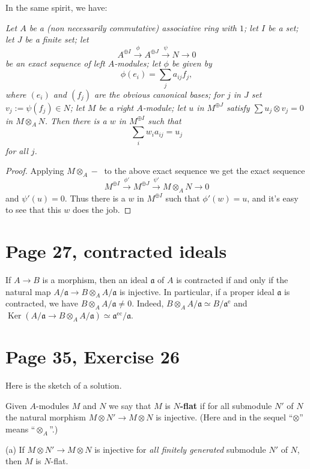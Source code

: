 \documentclass[12pt]{article}
\newcommand{\oo}{\operatorname}
\newcommand{\mf}{\mathfrak}
\begin{document}
In the same spirit, we have:

\emph{Let $A$ be a (non necessarily commutative) associative ring with $1$; let $I$ be a set; let $J$ be a finite set; let 
$$
A^{\oplus I}\xrightarrow\phi A^{\oplus J}\xrightarrow\psi N\to0
$$ 
be an exact sequence of left $A$-modules; let $\phi$ be given by 
$$
\phi(e_i)=\sum_ja_{ij}f_j,
$$ 
where $(e_i)$ and $(f_j)$ are the obvious canonical bases; for $j$ in $J$ set $v_j:=\psi(f_j)\in N$; let $M$ be a right $A$-module; let $u$ in $M^{\oplus J}$ satisfy $\sum u_j\otimes v_j=0$ in $M\otimes_AN$. Then there is a $w$ in $M^{\oplus I}$ such that 
$$
\sum_iw_ia_{ij}=u_j
$$ 
for all $j$.}

\begin{proof} 
Applying $M\otimes_A-\ $ to the above exact sequence we get the exact sequence 
$$
M^{\oplus I}\xrightarrow{\phi'}M^{\oplus J}\xrightarrow{\psi'}M\otimes_AN\to0
$$ 
and $\psi'(u)=0$. Thus there is a $w$ in $M^{\oplus I}$ such that $\phi'(w)=u$, and it's easy to see that this $w$ does the job. 
\end{proof}

\section{Page 27, contracted ideals}\label{27}%

If $A\to B$ is a morphism, then an ideal $\mf a$ of $A$ is contracted if and only if the natural map $A/\mf a\to B\otimes_A A/\mf a$ is injective. In particular, if a proper ideal $\mf a$ is contracted, we have $B\otimes_A A/\mf a\ne0$. Indeed, $B\otimes_A A/\mf a\simeq B/\mf a^{\oo e}$ and $\oo{Ker}(A/\mf a\to B\otimes_A A/\mf a)\simeq\mf a^{\oo{ec}}/\mf a$. %


\section{Page 35, Exercise 26}\label{35}%

Here is the sketch of a solution.

Given $A$-modules $M$ and $N$ we say that $M$ is $N$\textbf{-flat} if for all submodule $N'$ of $N$ the natural morphism $M\otimes N'\to M\otimes N$ is injective. (Here and in the sequel ``$\otimes$'' means ``$\otimes_A$''.) 

(a) If $M\otimes N'\to M\otimes N$ is injective for \emph{all finitely generated} submodule $N'$ of $N$, then $M$ is $N$-flat.
\end{document}
